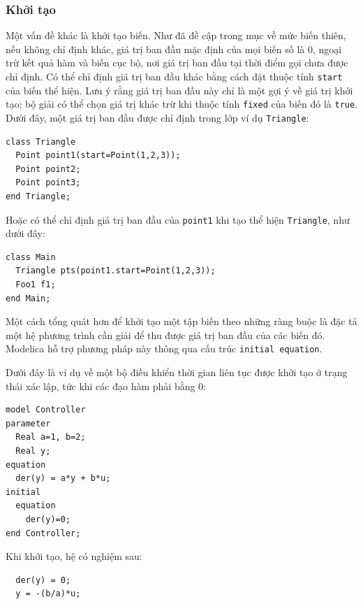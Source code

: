 \subsubsection{Khởi tạo}
Một vấn đề khác là khởi tạo biến. Như đã đề cập trong mục về mức biến thiên, nếu không chỉ định khác, giá trị ban đầu mặc định của mọi biến số là 0, ngoại trừ kết quả hàm và biến cục bộ, nơi giá trị ban đầu tại thời điểm gọi chưa được chỉ định. Có thể chỉ định giá trị ban đầu khác bằng cách đặt thuộc tính \texttt{start} của biến thể hiện. Lưu ý rằng giá trị ban đầu này chỉ là một gợi ý về giá trị khởi tạo; bộ giải có thể chọn giá trị khác trừ khi thuộc tính \texttt{fixed} của biến đó là \texttt{true}. Dưới đây, một giá trị ban đầu được chỉ định trong lớp ví dụ \texttt{Triangle}:
\begin{verbatim}
class Triangle
  Point point1(start=Point(1,2,3));
  Point point2;
  Point point3;
end Triangle;
\end{verbatim}
Hoặc có thể chỉ định giá trị ban đầu của \texttt{point1} khi tạo thể hiện \texttt{Triangle}, như dưới đây:
\begin{verbatim}
class Main
  Triangle pts(point1.start=Point(1,2,3));
  Foo1 f1;
end Main;
\end{verbatim}
Một cách tổng quát hơn để khởi tạo một tập biến theo những ràng buộc là đặc tả một hệ phương trình cần giải để thu được giá trị ban đầu của các biến đó. Modelica hỗ trợ phương pháp này thông qua cấu trúc \texttt{initial equation}.

Dưới đây là ví dụ về một bộ điều khiển thời gian liên tục được khởi tạo ở trạng thái xác lập, tức khi các đạo hàm phải bằng 0:
\begin{verbatim}
model Controller
parameter
  Real a=1, b=2;
  Real y;
equation
  der(y) = a*y + b*u;
initial
  equation
    der(y)=0;
end Controller;
\end{verbatim}
Khi khởi tạo, hệ có nghiệm sau:
\begin{verbatim}
  der(y) = 0;
  y = -(b/a)*u;
\end{verbatim}

